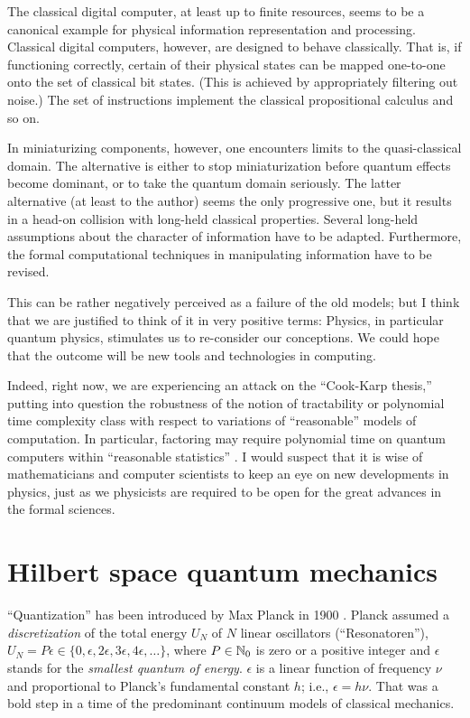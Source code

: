 The classical digital computer, at least up to finite resources,
seems to be a canonical example for physical information representation
and processing.
Classical digital computers, however, are designed to behave
classically. That
is, if functioning correctly, certain of their physical states can be
mapped one-to-one onto the set of classical bit states. (This is achieved
by appropriately filtering out noise.) The set of
instructions implement the classical propositional calculus and so on.

In miniaturizing components, however, one encounters limits to the
quasi-classical domain. The alternative is either to stop
miniaturization before quantum effects become dominant, or to take the
quantum domain seriously. The latter
alternative (at least to the author) seems the only progressive one, but
it results in a head-on
collision with long-held classical properties.
Several long-held assumptions about the character of
information  have to be adapted. Furthermore,
the formal computational techniques in manipulating information have to
be revised.

This can be rather negatively perceived as a failure of the old models;
but I think that we are justified to think of it in very positive terms:
Physics, in particular quantum physics, stimulates us to re-consider our
conceptions. We could hope that the outcome will be new
tools and technologies in computing.

Indeed, right now, we are experiencing an attack on the ``Cook-Karp
thesis,'' putting into question the
robustness of the notion of tractability or polynomial time complexity
class
with respect to variations of ``reasonable'' models of computation.
In particular, factoring may require polynomial time on quantum
computers within
``reasonable statistics'' \cite{shor:94}.
 I would suspect that it is wise of mathematicians
 and
computer scientists to keep an eye on new developments in physics, just
as we physicists are required to be open for the great advances in the
formal sciences.

\section{Hilbert space quantum mechanics}
``Quantization''
has been
introduced by
Max Planck
in 1900 \cite{planck:1901}.
Planck assumed
a {\em discretization} of the total energy
$U_N$ of
$N$
linear oscillators (``Resonatoren''),
$
U_N= P\epsilon \in \{ 0,\epsilon ,2\epsilon ,3\epsilon ,4\epsilon
,\ldots
\}
$,
where $P\in {\Bbb N}_0$ is zero or a positive
integer and $\epsilon$ stands for the {\em smallest quantum of energy}.
$\epsilon$ is a linear function of frequency $\nu$ and proportional to
Planck's fundamental constant $h$; i.e.,
$
\epsilon = h\nu
$.
That was a bold step in a time of the predominant continuum models of
classical mechanics.


